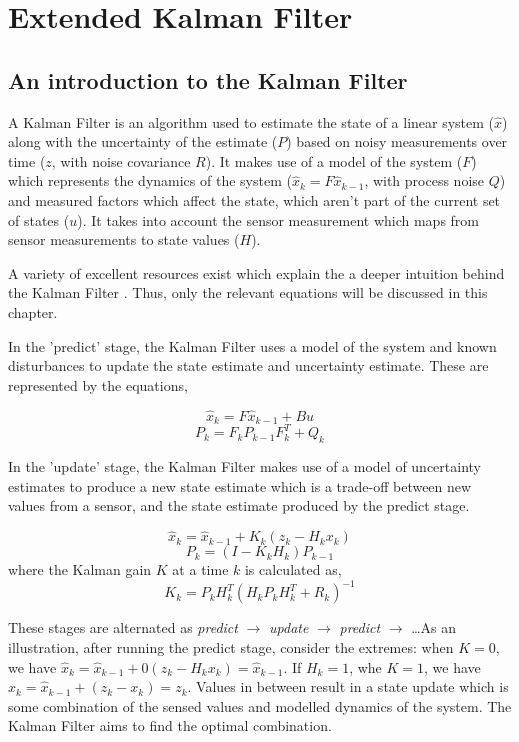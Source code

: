 \section{Extended Kalman Filter}
\subsection{An introduction to the Kalman Filter}
A Kalman Filter \cite{kalman1960new} is an algorithm used to estimate the state of a linear system ($\hat{x}$) along with the uncertainty of the estimate ($P$) based on noisy measurements over time ($z$, with noise covariance $R$). It makes use of a model of the system ($F$) which represents the dynamics of the system ($\hat{x}_{k} = F\hat{x}_{k-1}$, with process noise $Q$) and measured factors which affect the state, which aren't part of the current set of states ($u$). It takes into account the sensor measurement which maps from sensor measurements to state values ($H$).

A variety of excellent resources exist which explain the a deeper intuition behind the Kalman Filter \cite{website:wlu_kalman_tutorial, website:bzarg_kalman_tutorial}. Thus, only the relevant equations will be discussed in this chapter.

In the 'predict' stage, the Kalman Filter uses a model of the system and known disturbances to update the state estimate and uncertainty estimate. These are represented by the equations,

\[ \hat{x}_k = F \hat{x}_{k-1} + B u \]
\[ P_k = F_k P_{k-1} F_k^T + Q_k \]

In the 'update' stage, the Kalman Filter makes use of a model of uncertainty estimates to produce a new state estimate which is a trade-off between new values from a sensor, and the state estimate produced by the predict stage.

\[ \hat{x}_k = \hat{x}_{k-1} + K_k (z_k - H_k x_k) \]
\[ P_k = (I - K_k H_k) P_{k-1} \]
where the Kalman gain $K$ at a time $k$ is calculated as,
\[ K_k = P_k H_k^T (H_k P_k H_k^T + R_k)^{-1} \]

These stages are alternated as \emph{predict} $\rightarrow$ \emph{update} $\rightarrow$ \emph{predict} $\rightarrow$ \dots As an illustration, after running the predict stage, consider the extremes: when $K = 0$, we have $\hat{x}_k = \hat{x}_{k-1} + 0 (z_k - H_k x_k) = \hat{x}_{k-1}$. If $H_k = 1$, whe $K = 1$, we have $\hat{x}_k = \hat{x}_{k-1} + (z_k - x_k) = z_k$. Values in between result in a state update which is some combination of the sensed values and modelled dynamics of the system. The Kalman Filter aims to find the optimal combination.

